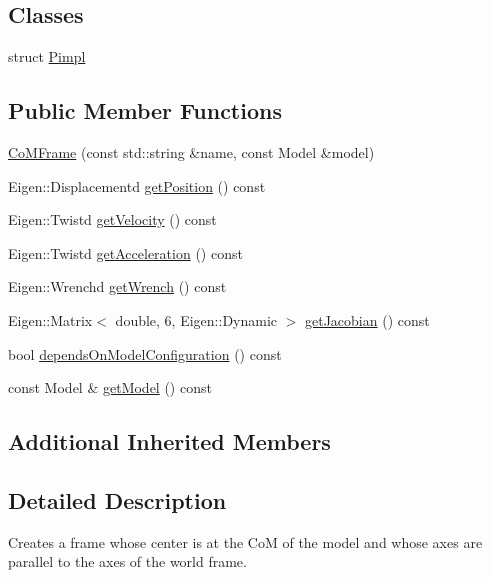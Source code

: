 \subsection*{Classes}
\begin{DoxyCompactItemize}
\item 
struct \hyperlink{structocra_1_1CoMFrame_1_1Pimpl}{Pimpl}
\end{DoxyCompactItemize}
\subsection*{Public Member Functions}
\begin{DoxyCompactItemize}
\item 
\hyperlink{classocra_1_1CoMFrame_a0b9177034d13b851238da7edfadcdf38}{Co\+M\+Frame} (const std\+::string \&name, const Model \&model)
\item 
Eigen\+::\+Displacementd \hyperlink{classocra_1_1CoMFrame_a809c05664b2e2abb489e930e27fbe2d4}{get\+Position} () const
\item 
Eigen\+::\+Twistd \hyperlink{classocra_1_1CoMFrame_a02be3e73c64903d67b1e7ada25c468c5}{get\+Velocity} () const
\item 
Eigen\+::\+Twistd \hyperlink{classocra_1_1CoMFrame_a9e59ca65720c553da5c75f484544829c}{get\+Acceleration} () const
\item 
Eigen\+::\+Wrenchd \hyperlink{classocra_1_1CoMFrame_a8e00462bbe13df6f595b7000d44240c6}{get\+Wrench} () const
\item 
Eigen\+::\+Matrix$<$ double, 6, Eigen\+::\+Dynamic $>$ \hyperlink{classocra_1_1CoMFrame_ab24f3400af3e8eb2a12d6597ff8a7a31}{get\+Jacobian} () const
\item 
bool \hyperlink{classocra_1_1CoMFrame_aaae3fd05da2f9e301dbe1c54b57fe624}{depends\+On\+Model\+Configuration} () const
\item 
const Model \& \hyperlink{classocra_1_1CoMFrame_afc280df9814e7eb2cf62f017f7bbfc2e}{get\+Model} () const
\end{DoxyCompactItemize}
\subsection*{Additional Inherited Members}


\subsection{Detailed Description}
Creates a frame whose center is at the CoM of the model and whose axes are parallel to the axes of the world frame. 

